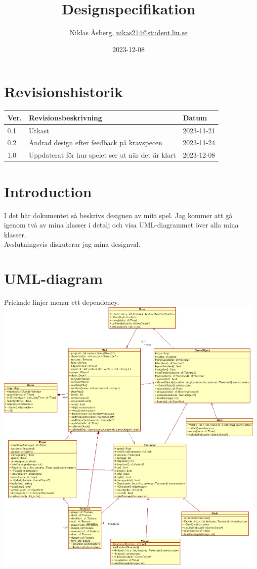 \documentclass{TDP005mall}
\author{Niklas Åsberg, \url{nikas214@student.liu.se}}
\title{Designspecifikation}
\date{2023-12-08}
\begin{document}
\projectpage
\section{Revisionshistorik}
\begin{table}[!h]
\begin{tabularx}{\linewidth}{|l|X|l|}
\hline
Ver. & Revisionsbeskrivning & Datum \\\hline
0.1 & Utkast & 2023-11-21 \\\hline
0.2 & Ändrad design efter feedback på kravspecen & 2023-11-24 \\\hline
1.0 & Uppdaterat för hur spelet ser ut när det är klart & 2023-12-08 \\\hline
\end{tabularx}
\end{table}

\tableofcontents
\newpage

\section{Introduction}
I det här dokumentet så beskrivs designen av mitt spel. Jag kommer att gå igenom två av mina klasser i detalj och visa UML-diagrammet över alla mina klasser. \\
Avslutningsvis diskuterar jag mina designval.


\section{UML-diagram}
Prickade linjer menar ett dependency. \\
\includegraphics[scale=0.58]{uml-diagram}
\end{document}
